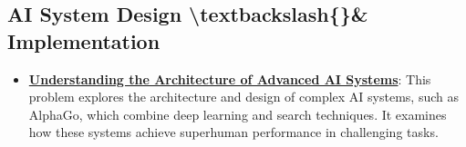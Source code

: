\documentclass{article}%
\begin{document}
%
\subsection{AI System Design \textbackslash{}textbackslash\{\}\& Implementation}%
\label{subsec:AISystemDesigntextbackslashImplementation}%
\begin{itemize}[leftmargin=*]%
\item \href{https://purdue.brightspace.com/d2l/common/assets/pdfjs-d2l-dist/1.0.14-legacy/web/viewer.html?file=\%2Fcontent\%2Fenforced\%2F1095467-wl.202510.CS.24300.001\%2F02L2-Intro.pdf\%3Fou\%3D1095467\&lang=en-us\&container=d2l-fileviewer-rendered-pdf\&fullscreen=d2l-fileviewer-rendered-pdf-dialog\&height=667#page=50}{\textbf{Understanding the Architecture of Advanced AI Systems}}: This problem explores the architecture and design of complex AI systems, such as AlphaGo, which combine deep learning and search techniques. It examines how these systems achieve superhuman performance in challenging tasks.%
\end{itemize}

%
\end{document}

